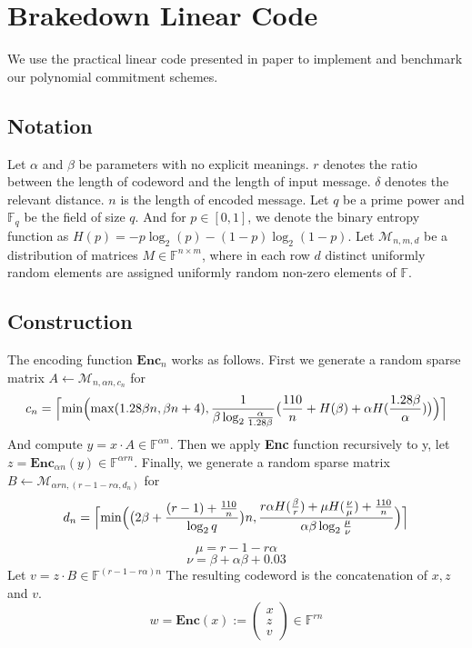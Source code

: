 \chapter{Brakedown Linear Code}

We use the practical linear code presented in paper \cite{brakedown} to implement and benchmark our polynomial commitment schemes.

\section{Notation}

Let $\alpha$ and $\beta$ be parameters with no explicit meanings. $r$ denotes the ratio between the length of codeword and the length of input message. $\delta$ denotes the relevant distance. $n$ is the length of encoded message. Let $q$ be a prime power and $\mathbb{F}_q$ be the field of size $q$. And for $p \in [0, 1]$, we denote the binary entropy function as $H(p) = -p\log_2(p) - (1 - p)\log_2(1-p)$. Let $\mathcal{M}_{n, m, d}$ be a distribution of matrices $M \in \mathbb{F}^{n \times m}$, where in each row $d$ distinct uniformly random elements are assigned uniformly random non-zero elements of $\mathbb{F}$.

\section{Construction}

The encoding function $\textbf{Enc}_n$ works as follows. First we generate a random sparse matrix $A \leftarrow \mathcal{M}_{n, \alpha n, c_n}$ for 
$$
    c_n = \Bigl \lceil \min \Bigl( \max (1.28 \beta n, \beta n + 4), \frac{1}{\beta \log_2 \frac{\alpha}{1.28 \beta}} \bigl( \frac{110}{n} + H(\beta) + \alpha H (\frac{1.28 \beta}{\alpha}) \bigr) \Bigr) \Bigr \rceil
$$
And compute $y = x \cdot A \in \mathbb{F}^{\alpha n}$. Then we apply \textbf{Enc} function recursively to y, let $z = \textbf{Enc}_{\alpha n}(y) \in \mathbb{F}^{\alpha r n}$. Finally, we generate a random sparse matrix $B \leftarrow \mathcal{M}_{\alpha r n, (r - 1 - r \alpha, d_n)}$ for
$$
    d_n = \Bigl \lceil \min \Bigl( \bigl( 2\beta + \frac{(r-1) + \frac{110}{n}}{\log_2 q} \bigr)n, \frac{r \alpha H(\frac{\beta}{r}) + \mu H(\frac{\nu}{\mu}) + \frac{110}{n}}{\alpha \beta \log_2 \frac{\mu}{\nu}} \Bigr) \Bigr \rceil
$$
$$
    \mu = r - 1 - r \alpha
$$
$$
    \nu = \beta + \alpha \beta + 0.03
$$
Let $v = z \cdot B \in \mathbb{F}^{(r - 1 - r\alpha)n}$ The resulting codeword is the concatenation of $x, z$ and $v$.
$$
    w = \textbf{Enc}(x) := \left( \begin{array}{c} x \\ z \\ v \end{array} \right) 
    \in \mathbb{F}^{rn}
$$

